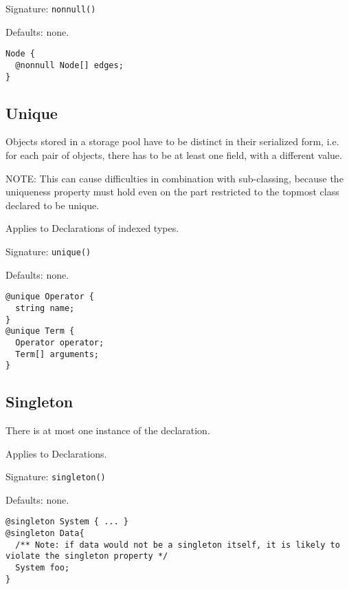 \documentclass[a4paper,10pt]{article}
\begin{document}
Signature: \verb/nonnull()/

Defaults: none.

\begin{lstlisting}[label=nonnullExample,caption=Examples,language=skill]
Node {
  @nonnull Node[] edges;
}
\end{lstlisting}


\subsection*{Unique}
Objects stored in a storage pool have to be distinct in their serialized form, i.e. for each pair of objects, there has to be at least one field, with a different value.

NOTE: This can cause difficulties in combination with sub-classing, because the uniqueness property must hold even on the part restricted to the topmost class declared to be unique.

Applies to Declarations of indexed types.

Signature: \verb/unique()/

Defaults: none.

\begin{lstlisting}[label=uniqueExample,caption=Examples,language=skill]
@unique Operator {
  string name;
}
@unique Term {
  Operator operator;
  Term[] arguments;
}
\end{lstlisting}


\subsection*{Singleton}
There is at most one instance of the declaration.

Applies to Declarations.

Signature: \verb/singleton()/

Defaults: none.

\begin{lstlisting}[label=singletonExample,caption=Examples,language=skill]
@singleton System { ... }
@singleton Data{
  /** Note: if data would not be a singleton itself, it is likely to violate the singleton property */
  System foo;
}
\end{lstlisting}


\end{document}
